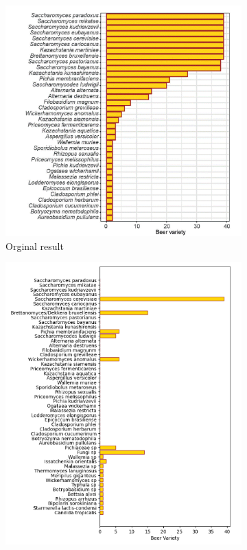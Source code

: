 \begin{figure}[H]
    \centering
    \begin{subfigure}[b]{0.45\textwidth}
        \centering
        \includegraphics[width=\textwidth]{images/orginal_BeerDEcoded_beer_variety.png}
        \caption{Orginal result}
        \label{fig:results:orginal_BeerDecoded_beer_variety}
    \end{subfigure}
    \hfill
    \begin{subfigure}[b]{0.45\textwidth}
        \centering
        \includegraphics[width=\textwidth]{images/BeerDEcoded_beer_variety.png} 

\end{subfigure}
\end{figure}
